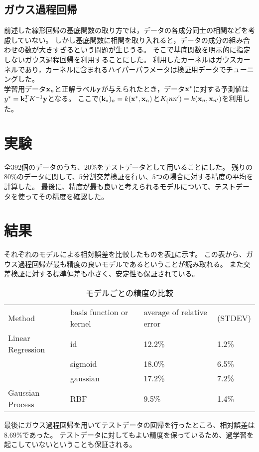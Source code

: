 \documentclass{jarticle}
\begin{document}
\subsection{ガウス過程回帰}
前述した線形回帰の基底関数の取り方では，データの各成分同士の相関などを考慮していない。
しかし基底関数に相関を取り入れると，データの成分の組み合わせの数が大きすぎるという問題が生じうる。
そこで基底関数を明示的に指定しないガウス過程回帰を利用することにした。
利用したカーネルはガウスカーネルであり，カーネルに含まれるハイパーパラメータは検証用データでチューニングした。\\
学習用データ${\bf x}_n$と正解ラベル${\bf y}$が与えられたとき，データ${\bf x}^*$に対する予測値は$y^* = {\bf k}_{*}^{T} K^{-1} {\bf y}$となる。
ここで$({\bf k}_{*})_n = k({\bf x}^*,{\bf x}_n)$と$K_(n n') = k({\bf x}_n,{\bf x}_{n'})$を利用した。

\section{実験}
全$392$個のデータのうち、$20 \%$をテストデータとして用いることにした。
残りの$80 \%$のデータに関して、$5$分割交差検証を行い、$5$つの場合に対する精度の平均を計算した。
最後に、精度が最も良いと考えられるモデルについて、テストデータを使ってその精度を確認した。

\section{結果}
それぞれのモデルによる相対誤差を比較したものを表\ref{model}に示す。
この表から、ガウス過程回帰が最も精度の良いモデルであるということが読み取れる。
また交差検証に対する標準偏差も小さく、安定性も保証されている。
\begin{table}[htbp]
\begin{center}
\caption{モデルごとの精度の比較}
\begin{tabular}{llll}
Method & basis function or kernel & average of relative error & (STDEV)\\
Linear Regression & id & 12.2\% & 1.2\% \\
 & sigmoid &18.0\% & 6.5\% \\
 & gaussian & 17.2\% & 7.2\% \\
Gaussian Process & RBF &9.5\% & 1.4\% \\
\end{tabular}
\label{model}
\end{center}
\end{table}
最後にガウス過程回帰を用いてテストデータの回帰を行ったところ、相対誤差は$8.69 \%$であった。
テストデータに対してもよい精度を保っているため、過学習を起こしていないということも保証される。
\end{document}
